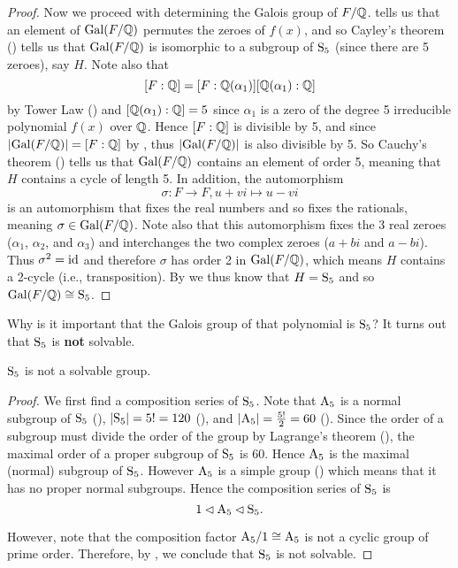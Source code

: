 \begin{proof}
    Now we proceed with determining the Galois group of $F/\mathbb{Q}$.  tells us that an element of $\mathrm{Gal}(F/\mathbb{Q})$ permutes the zeroes of $f(x)$, and so Cayley's theorem () tells us that $\mathrm{Gal}(F/\mathbb{Q})$ is isomorphic to a subgroup of $\mathrm{S}_{5}$ (since there are 5 zeroes), say $H$. Note also that
    \[
        [F:\mathbb{Q}] = [F:\mathbb{Q}(\alpha_1)][\mathbb{Q}(\alpha_1):\mathbb{Q}]
    \]
    by Tower Law () and $[\mathbb{Q}(\alpha_1):\mathbb{Q}] = 5$ since $\alpha_1$ is a zero of the degree 5 irreducible polynomial $f(x)$ over $\mathbb{Q}$. Hence $[F:\mathbb{Q}]$ is divisible by 5, and since $|\mathrm{Gal}(F/\mathbb{Q})| = [F:\mathbb{Q}]$ by , thus $|\mathrm{Gal}(F/\mathbb{Q})|$ is also divisible by 5. So Cauchy's theorem () tells us that $\mathrm{Gal}(F/\mathbb{Q})$ contains an element of order 5, meaning that $H$ contains a cycle of length 5. In addition, the automorphism
    \[
        \sigma: F \to F, u + vi \mapsto u - vi
    \]
    is an automorphism that fixes the real numbers and so fixes the rationals, meaning $\sigma \in \mathrm{Gal}(F/\mathbb{Q})$. Note also that this automorphism fixes the 3 real zeroes ($\alpha_1$, $\alpha_2$, and $\alpha_3$) and interchanges the two complex zeroes ($a+bi$ and $a-bi$). Thus $\sigma^2 = \mathrm{id}$ and therefore $\sigma$ has order 2 in $\mathrm{Gal}(F/\mathbb{Q})$, which means $H$ contains a 2-cycle (i.e., transposition). By  we thus know that $H = \mathrm{S}_{5}$ and so $\mathrm{Gal}(F/\mathbb{Q}) \cong \mathrm{S}_{5}$.
\end{proof}

Why is it important that the Galois group of that polynomial is $\mathrm{S}_{5}$? It turns out that $\mathrm{S}_{5}$ is \textbf{not} solvable.

\begin{proposition}
    $\mathrm{S}_{5}$ is not a solvable group.
\end{proposition}
\begin{proof}
    We first find a composition series of $\mathrm{S}_{5}$. Note that $\mathrm{A}_{5}$ is a normal subgroup of $\mathrm{S}_{5}$ (), $|\mathrm{S}_{5}| = 5! = 120$ (), and $|\mathrm{A}_{5}| = \frac{5!}2 = 60$ (). Since the order of a subgroup must divide the order of the group by Lagrange's theorem (), the maximal order of a proper subgroup of $\mathrm{S}_{5}$ is 60. Hence $\mathrm{A}_{5}$ is the maximal (normal) subgroup of $\mathrm{S}_{5}$. However $\mathrm{A}_{5}$ is a simple group () which means that it has no proper normal subgroups. Hence the composition series of $\mathrm{S}_{5}$ is
    \[
        1 \lhd \mathrm{A}_{5} \lhd \mathrm{S}_{5}.
    \]

    However, note that the composition factor $\mathrm{A}_{5}/1 \cong \mathrm{A}_{5}$ is not a cyclic group of prime order. Therefore, by , we conclude that $\mathrm{S}_{5}$ is not solvable.
\end{proof}

